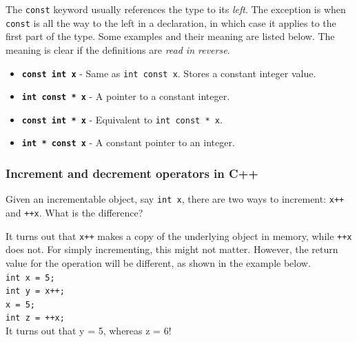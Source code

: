 The \texttt{const} keyword usually references the type to its \textit{left}. The exception is when \texttt{const} is all the way to the left in a declaration, in which case it applies to the first part of the type. Some examples and their meaning are listed below. The meaning is clear if the definitions are \textit{read in reverse}.

\begin{itemize}
	\item \textbf{\texttt{const int x}} - Same as \texttt{int const x}. Stores a constant integer value.
	\item \textbf{\texttt{int const * x}} - A pointer to a constant integer.
	\item \textbf{\texttt{const int * x}} - Equivalent to \texttt{int const * x}.
	\item \textbf{\texttt{int * const x}} - A constant pointer to an integer.
\end{itemize}

\subsubsection{Increment and decrement operators in C++}

Given an incrementable object, say \texttt{int x}, there are two ways to increment: \texttt{x++} and \texttt{++x}. What is the difference?

It turns out that \texttt{x++} makes a copy of the underlying object in memory, while \texttt{++x} does not. For simply incrementing, this might not matter. However, the return value for the operation will be different, as shown in the example below. \\

\indent \indent \texttt{int x = 5;} \\
\indent \indent \texttt{int y = x++;} \\
\indent \indent \texttt{x = 5;} \\
\indent \indent \texttt{int z = ++x;} \\

It turns out that y = 5, whereas z = 6!